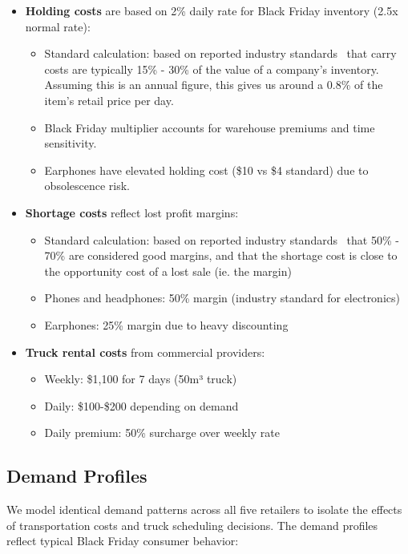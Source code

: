 \documentclass[a4paper,12pt]{article}
\begin{document}
\begin{itemize}
    \item \textbf{Holding costs} are based on 2\% daily rate for Black Friday inventory (2.5x normal rate):
    \begin{itemize}
        \item Standard calculation: based on reported industry standards~\cite{holdingcosts} that carry costs are typically 15\% - 30\% of the value of a company's inventory.
        Assuming this is an annual figure, this gives us around a 0.8\% of the item's retail price per day.
        \item Black Friday multiplier accounts for warehouse premiums and time sensitivity.
        \item Earphones have elevated holding cost (\$10 vs \$4 standard) due to obsolescence risk.
    \end{itemize}

    \item \textbf{Shortage costs} reflect lost profit margins:
    \begin{itemize}
        \item Standard calculation: based on reported industry standards~\cite{shortagecosts} that 50\% - 70\% are considered good margins, and that the shortage cost is close to the opportunity cost of a lost sale (ie. the margin)
        \item Phones and headphones: 50\% margin (industry standard for electronics)
        \item Earphones: 25\% margin due to heavy discounting
    \end{itemize}

    \item \textbf{Truck rental costs} from commercial providers:
    \begin{itemize}
        \item Weekly: \$1,100 for 7 days (50m³ truck)
        \item Daily: \$100-\$200 depending on demand
        \item Daily premium: 50\% surcharge over weekly rate
    \end{itemize}
\end{itemize}


\subsection{Demand Profiles}\label{subsec:demand-profiles}

We model identical demand patterns across all five retailers to isolate the effects of transportation costs and truck scheduling decisions.
The demand profiles reflect typical Black Friday consumer behavior:
\end{document}
